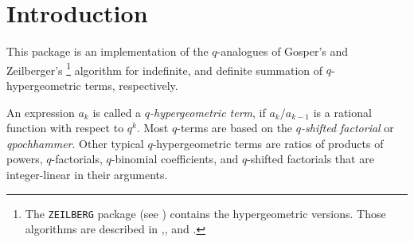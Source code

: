 \newcommand{\fcn}[2]{{\mathrm #1}(#2)}
\newcommand{\ifcn}[3]{{\mathrm #1}_{#2}(#3)}
\newcommand{\qgosper}{$q$-Gosper\ }
\newcommand{\qgosperalg}{\qgosper algorithm\ }
\newcommand{\qzeilalg}{$q$-Zeilberger algorithm\ }
\newcommand{\qfac}[2]{\left(#1;\,q\right)_{#2}}
\newcommand{\qatom}[1]{\left(#1;\,q\right)_{\infty}}
\newcommand{\binomial}[2]{{#1 \choose #2}}
\newcommand{\qbinomial}[2]{{{#1 \choose #2}\!}_q}
\newcommand{\qfactorial}[2]{}

{\setcounter{redprompt}{0}}
\newcommand{\redprompt}{\stepcounter{redprompt}\theredprompt:}
\newenvironment{redoutput}{\small\begin{alltt}}{\end{alltt}\noindent{}}



%
\maketitle
%
\section{Introduction}

This package is an implementation of the $q$-analogues of Gosper's
and Zeil\-berger's%
%
\footnote{The {\tt ZEILBERG} package (see \cite{Koepf2})
contains the hypergeometric versions. Those algorithms are described in 
\cite{Gosper},\cite{hyper_Zeilberger1},\cite{hyper_Zeilberger2}
and \cite{Koepf1}.}
%
algorithm for indefinite, and definite summation of
$q$-hypergeo\-metric terms, respectively.

An expression $a_k$ is called a {\sl $q$-hypergeometric term}, if
$a_{k}/a_{k-1}$ is a rational function with respect to $q^k$. Most
$q$-terms are based on the {\sl $q$-shifted factorial} or 
{\sl qpochhammer}. Other typical $q$-hypergeometric terms are ratios 
of products of powers, $q$-factorials, $q$-binomial coefficients, and 
$q$-shifted factorials that are integer-linear in their arguments.


